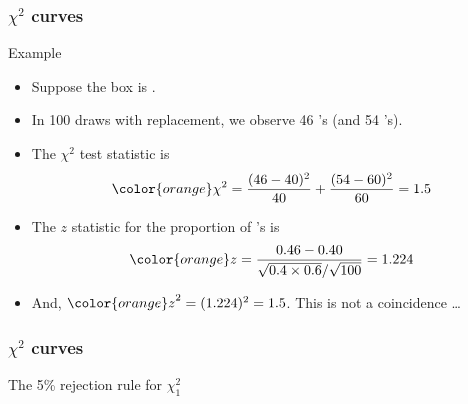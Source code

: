 \documentclass[handout]{beamer}
\begin{document}
   \begin{frame} \frametitle{$\chi^2$ curves}

   \begin{block}
   {Example}

   \begin{itemize}
   \item Suppose the box is .
   \item In 100 draws with replacement, we observe 46 's
   (and 54 's).
   \item The $\chi^2$ test statistic is
     $$
     {\color{orange} \chi^2} = \frac{(46-40)^2}{40} + \frac{(54-60)^2}{60} = 1.5
     $$
   \item The $z$ statistic for the proportion of 's is
   $$
   {\color{orange} z} = \frac{0.46-0.40}{\sqrt{0.4 \times 0.6} / \sqrt{100}} = 1.224
   $$
   \item And, ${\color{orange} z}^2 = (1.224)^2 = 1.5$. This is not a coincidence \dots

   \end{itemize}
   \end{block}
   \end{frame}



   \begin{frame}
   \frametitle{$\chi^2$ curves}
   \begin{center}
   \end{center}
   The 5\% rejection rule for $\chi^2_{1}$
   \end{frame}
\end{document}

